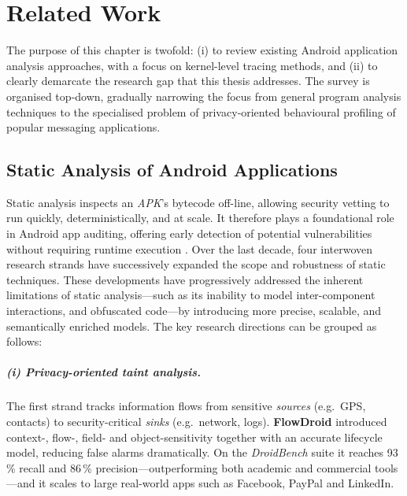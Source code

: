 \documentclass[a4paper,12pt]{report}
\begin{document}
\chapter{Related Work}\label{ch:related}

The purpose of this chapter is twofold: (i) to review existing Android application analysis approaches, with a focus on kernel-level tracing methods, and (ii) to
clearly demarcate the research gap that this thesis addresses.  The survey is
organised top‑down, gradually narrowing the focus from general program analysis
techniques to the specialised problem of privacy‑oriented behavioural
profiling of popular messaging applications.

\section{Static Analysis of Android Applications}
\label{sec:rw:static}

Static analysis inspects an \emph{APK}'s bytecode off-line, allowing security vetting to run quickly, deterministically, and at scale. It therefore plays a foundational role in Android app auditing, offering early detection of potential vulnerabilities without requiring runtime execution \cite{arzt2014flowdroid}.  Over the last decade, four interwoven research strands have successively expanded the scope and robustness of static techniques. These developments have progressively addressed the inherent limitations of static analysis—such as its inability to model inter-component interactions, and obfuscated code—by introducing more precise, scalable, and semantically enriched models. The key research directions can be grouped as follows:

\paragraph{(i) Privacy-oriented taint analysis.}
The first strand tracks information flows from sensitive \emph{sources} (e.g.\ GPS, contacts) to security-critical \emph{sinks} (e.g.\ network, logs).  \textbf{FlowDroid} introduced context-, flow-, field- and object-sensitivity together with an accurate lifecycle model, reducing false alarms dramatically.  On the \emph{DroidBench} suite it reaches 93\,\% recall and 86\,\% precision—outperforming both academic and commercial tools \cite{arzt2014flowdroid}—and it scales to large real-world apps such as Facebook, PayPal and LinkedIn.
\end{document}
